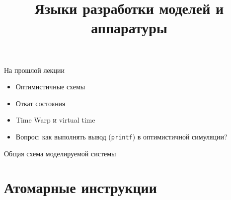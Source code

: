 

\title{Языки разработки моделей и аппаратуры}



\startslides

\begin{frame}{На прошлой лекции}
\begin{itemize}
\item Оптимистичные схемы
\item Откат состояния 
\item Time Warp и virtual time \pause
\item Вопрос: как выполнять вывод (\texttt{printf}) в оптимистичной симуляции?
\end{itemize}

\end{frame}

\begin{frame}{Общая схема моделируемой системы}

\centering

    
\end{frame}


\section{Атомарные инструкции}

